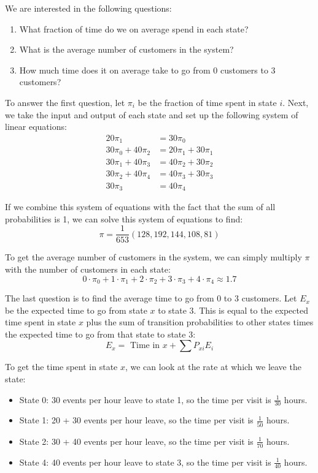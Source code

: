 \documentclass[12pt]{article}
\begin{document}
\noindent
We are interested in the following questions:

\begin{enumerate}
    \item What fraction of time do we on average spend in each state?
    \item What is the average number of customers in the system?
    \item How much time does it on average take to go from 0 customers to 3 customers?
\end{enumerate}

\noindent
To answer the first question, let $\pi_i$ be the fraction of time spent in state $i$.
Next, we take the input and output of each state and set up the following system of linear equations:
\begin{equation*}
    \begin{split}
        20\pi_1 & = 30\pi_0 \\
        30\pi_0 + 40\pi_2 & = 20\pi_1 + 30\pi_1 \\
        30\pi_1 + 40\pi_3 & = 40\pi_2 + 30\pi_2 \\
        30\pi_2 + 40\pi_4 & = 40\pi_3 + 30\pi_3 \\
        30\pi_3 & = 40\pi_4
    \end{split}
\end{equation*}

\newpage
\noindent
If we combine this system of equations with the fact that the sum of all probabilities is 1, we can solve this system of equations to find:
\[ \pi = \frac{1}{653} \left( 128, 192, 144, 108, 81 \right) \]

\noindent
To get the average number of customers in the system, we can simply multiply $\pi$ with the number of customers in each state:
\[ 0 \cdot \pi_0 + 1 \cdot \pi_1 + 2 \cdot \pi_2 + 3 \cdot \pi_3 + 4 \cdot \pi_4 \approx 1.7 \]

\noindent
The last question is to find the average time to go from 0 to 3 customers.
Let $E_x$ be the expected time to go from state $x$ to state 3.
This is equal to the expected time spent in state $x$ plus the sum of transition probabilities to other states times the expected time to go from that state to state 3:
\[ E_x = \text{ Time in } x + \sum P_{xi}E_{i} \]

\noindent
To get the time spent in state $x$, we can look at the rate at which we leave the state:

\begin{itemize}
    \item State 0: 30 events per hour leave to state 1, so the time per visit is $\frac{1}{30}$ hours.
    \item State 1: 20 + 30 events per hour leave, so the time per visit is $\frac{1}{50}$ hours.
    \item State 2: 30 + 40 events per hour leave, so the time per visit is $\frac{1}{70}$ hours.
    \item State 4: 40 events per hour leave to state 3, so the time per visit is $\frac{1}{40}$ hours.
\end{itemize}
\end{document}
